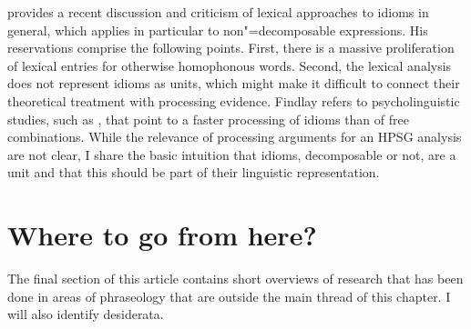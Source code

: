 \documentclass[output=paper
	        ,collection
	        ,collectionchapter
 	        ,biblatex
                ,babelshorthands
                ,newtxmath
                ,draftmode
                ,colorlinks, citecolor=brown
]{langscibook}
\begin{document}
\citet{Findlay:17} provides a recent discussion and criticism of lexical approaches to idioms in general, which applies in particular to non"=decomposable expressions. 
His reservations comprise the following points. 
First, there is a massive proliferation of lexical entries for otherwise homophonous words. 
%
Second, the lexical analysis does not represent idioms as units, which might make it difficult to connect their theoretical treatment with processing evidence. 
Findlay refers to psycholinguistic studies, such as \citet{Swinney:Cutler:79}, that point to a faster processing of idioms than of free combinations.
While the relevance of processing arguments for an HPSG analysis are not clear, I share the basic intuition that idioms, decomposable or not, are a unit and that this should be part of their linguistic representation.






\section{Where to go from here?}
\label{Sec-WhereToGo}

The final section of this article contains short overviews of research that has been done in areas of phraseology that are outside the main thread of this chapter. I will also identify desiderata. 
\end{document}
